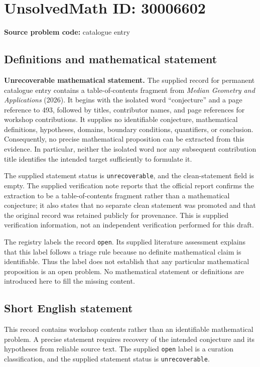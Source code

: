\documentclass[11pt]{article}
\begin{document}
\section*{UnsolvedMath ID: 30006602}
\textbf{Source problem code:} catalogue entry
\subsection{Definitions and mathematical statement}
\textbf{Unrecoverable mathematical statement.} The supplied record for permanent catalogue entry contains a table-of-contents fragment from \emph{Median Geometry and Applications} (2026). It begins with the isolated word ``conjecture'' and a page reference to 493, followed by titles, contributor names, and page references for workshop contributions. It supplies no identifiable conjecture, mathematical definitions, hypotheses, domains, boundary conditions, quantifiers, or conclusion. Consequently, no precise mathematical proposition can be extracted from this evidence. In particular, neither the isolated word nor any subsequent contribution title identifies the intended target sufficiently to formulate it.

The supplied statement status is \texttt{unrecoverable}, and the clean-statement field is empty. The supplied verification note reports that the official report confirms the extraction to be a table-of-contents fragment rather than a mathematical conjecture; it also states that no separate clean statement was promoted and that the original record was retained publicly for provenance. This is supplied verification information, not an independent verification performed for this draft.

The registry labels the record \texttt{open}. Its supplied literature assessment explains that this label follows a triage rule because no definite mathematical claim is identifiable. Thus the label does not establish that any particular mathematical proposition is an open problem. No mathematical statement or definitions are introduced here to fill the missing content.
\subsection{Short English statement}
This record contains workshop contents rather than an identifiable mathematical problem. A precise statement requires recovery of the intended conjecture and its hypotheses from reliable source text. The supplied \texttt{open} label is a curation classification, and the supplied statement status is \texttt{unrecoverable}.
\end{document}
